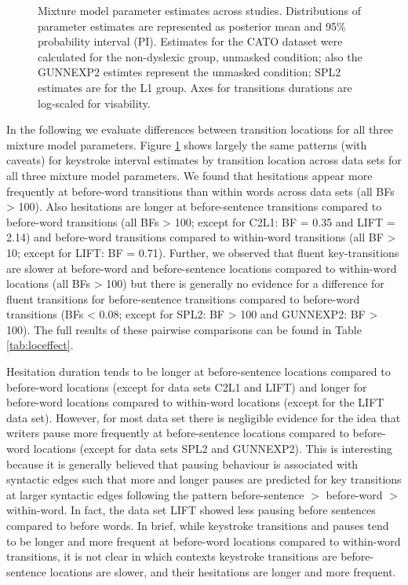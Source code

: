 \documentclass[
  english,
  man,floatsintext]{apa7}
\begin{document}
\begin{appendix}
\begin{figure}
{}

\caption{Mixture model parameter estimates across studies. Distributions of parameter estimates are represented as posterior mean and 95\% probability interval (PI). Estimates for the CATO dataset were calculated for the non-dyslexic group, unmasked condition; also the GUNNEXP2 estimtes represent the unmasked condition; SPL2 estimates are for the L1 group. Axes for transitions durations are log-scaled for visability.}\label{fig:crossstudypost}
\end{figure}

In the following we evaluate differences between transition locations
for all three mixture model parameters. Figure \ref{fig:crossstudypost}
shows largely the same patterns (with caveats) for keystroke interval
estimates by transition location across data sets for all three mixture
model parameters. We found that hesitations appear more frequently at
before-word transitions than within words across data sets (all BFs
\textgreater{} 100). Also hesitations are longer at before-sentence
transitions compared to before-word transitions (all BFs \textgreater{}
100; except for C2L1: BF = 0.35 and LIFT = 2.14) and before-word
transitions compared to within-word transitions (all BF \textgreater{}
10; except for LIFT: BF = 0.71). Further, we observed that fluent
key-transitions are slower at before-word and before-sentence locations
compared to within-word locations (all BFs \textgreater{} 100) but there
is generally no evidence for a difference for fluent transitions for
before-sentence transitions compared to before-word transitions (BFs
\textless{} 0.08; except for SPL2: BF \textgreater{} 100 and GUNNEXP2:
BF \textgreater{} 100). The full results of these pairwise comparisons
can be found in Table \ref{tab:loceffect}.

Hesitation duration tends to be longer at before-sentence locations
compared to before-word locations (except for data sets C2L1 and LIFT)
and longer for before-word locations compared to within-word locations
(except for the LIFT data set). However, for most data set there is
negligible evidence for the idea that writers pause more frequently at
before-sentence locations compared to before-word locations (except for
data sets SPL2 and GUNNEXP2). This is interesting because it is
generally believed that pausing behaviour is associated with syntactic
edges such that more and longer pauses are predicted for key transitions
at larger syntactic edges following the pattern before-sentence \(>\)
before-word \(>\) within-word. In fact, the data set LIFT showed less
pausing before sentences compared to before words. In brief, while
keystroke transitions and pauses tend to be longer and more frequent at
before-word locations compared to within-word transitions, it is not
clear in which contexts keystroke transitions are before-sentence
locations are slower, and their hesitations are longer and more
frequent.


\end{appendix}
\end{document}
